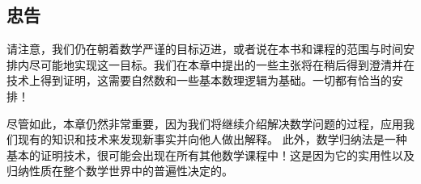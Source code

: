 \subsection{忠告}

请注意，我们仍在朝着数学严谨的目标迈进，或者说在本书和课程的范围与时间安排内尽可能地实现这一目标。我们在本章中提出的一些主张将在稍后得到澄清并在技术上得到证明，这需要自然数和一些基本数理逻辑为基础。一切都有恰当的安排！

尽管如此，本章仍然非常重要，因为我们将继续介绍解决数学问题的过程，应用我们现有的知识和技术来发现新事实并向他人做出解释。 此外，数学归纳法是一种基本的证明技术，很可能会出现在所有其他数学课程中！这是因为它的实用性以及归纳性质在整个数学世界中的普遍性决定的。